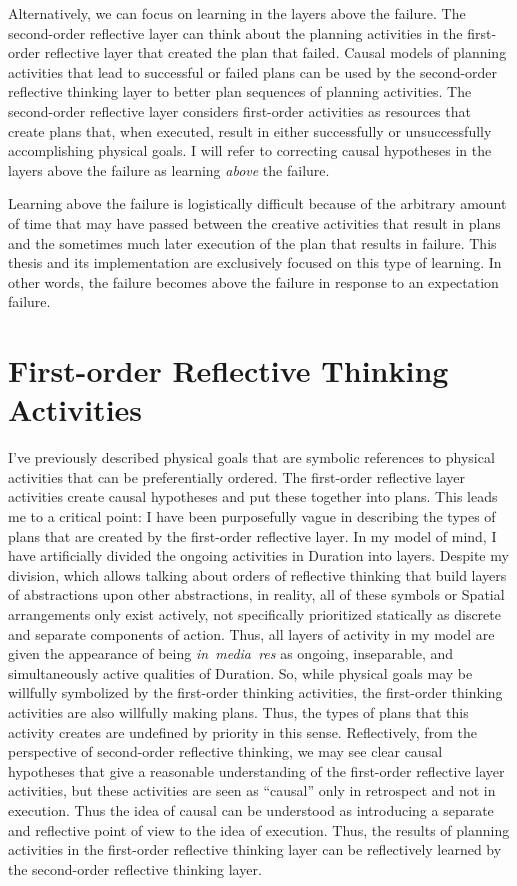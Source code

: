 Alternatively, we can focus on learning in the layers above the
failure.  The second-order reflective layer can think about the
planning activities in the first-order reflective layer that created
the plan that failed.  Causal models of planning activities that lead
to successful or failed plans can be used by the second-order
reflective thinking layer to better plan sequences of planning
activities.  The second-order reflective layer considers first-order
activities as resources that create plans that, when executed, result
in either successfully or unsuccessfully accomplishing physical goals.
I will refer to correcting causal hypotheses in the layers above the
failure as learning \emph{above} the failure.

Learning above the failure is logistically difficult because of the
arbitrary amount of time that may have passed between the creative
activities that result in plans and the sometimes much later execution
of the plan that results in failure.  This thesis and its
implementation are exclusively focused on this type of learning.  In
other words, the failure becomes above the failure in response to an
expectation failure.

\section{First-order Reflective Thinking Activities}

I've previously described physical goals that are symbolic references
to physical activities that can be preferentially ordered.  The
first-order reflective layer activities create causal hypotheses and
put these together into plans.  This leads me to a critical point: I
have been purposefully vague in describing the types of plans that are
created by the first-order reflective layer.  In my model of mind, I
have artificially divided the ongoing activities in Duration into
layers.  Despite my division, which allows talking about orders of
reflective thinking that build layers of abstractions upon other
abstractions, in reality, all of these symbols or Spatial arrangements
only exist actively, not specifically prioritized statically as
discrete and separate components of action.  Thus, all layers of
activity in my model are given the appearance of being
\emph{in~media~res} as ongoing, inseparable, and simultaneously active
qualities of Duration.  So, while physical goals may be willfully
symbolized by the first-order thinking activities, the first-order
thinking activities are also willfully making plans.  Thus, the types
of plans that this activity creates are undefined by priority in this
sense.  Reflectively, from the perspective of second-order reflective
thinking, we may see clear causal hypotheses that give a reasonable
understanding of the first-order reflective layer activities, but
these activities are seen as ``causal'' only in retrospect and not in
execution.  Thus the idea of causal can be understood as introducing a
separate and reflective point of view to the idea of execution.  Thus,
the results of planning activities in the first-order reflective
thinking layer can be reflectively learned by the second-order
reflective thinking layer.

